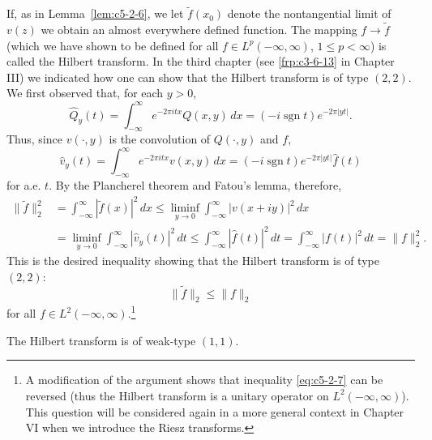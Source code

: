 If, as in Lemma~\ref{lem:c5-2-6}, we let $\tilde{f}(x_{0})$ denote the
nontangential limit of $v(z)$ we obtain an almost everywhere defined function.
The mapping $f \to \tilde{f}$ (which we have shown to be defined for all
$f \in L^{p}(-\infty, \infty)$, $1 \leq p < \infty$) is called the Hilbert
transform. In the third chapter (see \eqref{frp:c3-6-13} in Chapter III) we
indicated how one can show that the Hilbert transform is of type $(2, 2)$. We
first observed that, for each $y > 0$,
\[
\hat{Q}_{y}(t)=\int_{-\infty}^{\infty}e^{-2\pi itx}Q(x,y)\,dx
=(-i\operatorname{sgn}t)e^{-2\pi|yt|}.
\]
Thus, since $v(\cdot, y)$ is the convolution of $Q(\cdot, y)$ and $f$,
\[
\hat{v}_{y}(t)=\int_{-\infty}^{\infty}e^{-2\pi itx}v(x,y)\,dx
=(-i\operatorname{sgn}t)e^{-2\pi|yt|}\hat{f}(t)
\]
for a.e. $t$. By the Plancherel theorem and Fatou's lemma, therefore,
\begin{align*}
\|\tilde{f}\|_{2}^{2}&=\int_{-\infty}^{\infty}|\tilde{f}(x)|^{2}\,dx
\leq\liminf_{y \to 0}\int_{-\infty}^{\infty}|v(x+iy)|^{2}\,dx\\
&=\liminf_{y \to 0}\int_{-\infty}^{\infty}|\hat{v}_{y}(t)|^{2}\,dt
\leq\int_{-\infty}^{\infty}|\hat{f}(t)|^{2}\,dt
=\int_{-\infty}^{\infty}|f(t)|^{2}\,dt=\|f\|_{2}^{2}.
\end{align*}
This is the desired inequality showing that the Hilbert transform is of type
$(2, 2)$:
\begin{equation}\label{eq:c5-2-7}
\|\tilde{f}\|_{2}\leq\|f\|_{2}
\end{equation}
for all $f \in L^{2}(-\infty, \infty)$.\footnote{A modification of the argument
shows that inequality \eqref{eq:c5-2-7} can be reversed (thus the Hilbert
transform is a unitary operator on $L^{2}(-\infty, \infty)$). This question
will be considered again in a more general context in Chapter VI when we
introduce the Riesz transforms.}

\begin{lemma}\label{lem:c5-2-8}
The Hilbert transform is of weak-type $(1, 1)$.
\end{lemma}

